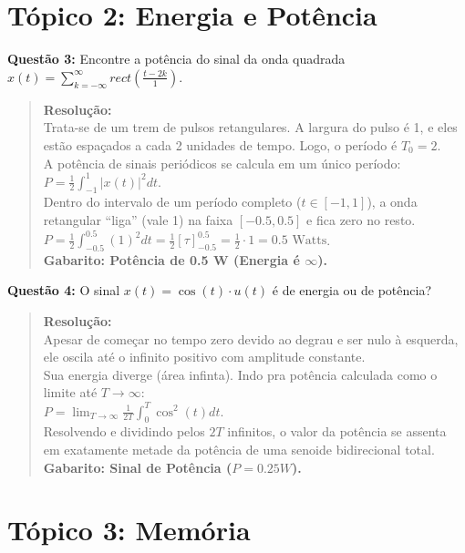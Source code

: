 \section{Tópico 2: Energia e Potência}\label{tuxf3pico-2-energia-e-potuxeancia}

\textbf{Questão 3:} Encontre a potência do sinal da onda quadrada \(x(t) = \sum_{k=-\infty}^{\infty} rect\left(\frac{t - 2k}{1}\right)\).

\begin{quote}
\textbf{Resolução:}\\
Trata-se de um trem de pulsos retangulares. A largura do pulso é 1, e eles estão espaçados a cada 2 unidades de tempo. Logo, o período é \(T_0 = 2\).\\
A potência de sinais periódicos se calcula em um único período:\\
\(P = \frac{1}{2} \int_{-1}^{1} |x(t)|^2 dt\).\\
Dentro do intervalo de um período completo (\(t \in [-1, 1]\)), a onda retangular ``liga'' (vale 1) na faixa \([-0.5, 0.5]\) e fica zero no resto.\\
\(P = \frac{1}{2} \int_{-0.5}^{0.5} (1)^2 dt = \frac{1}{2} \left[ \tau \right]_{-0.5}^{0.5} = \frac{1}{2} \cdot 1 = 0.5 \text{ Watts}\).\\
\textbf{Gabarito: Potência de 0.5 W (Energia é \(\infty\)).}
\end{quote}

\textbf{Questão 4:} O sinal \(x(t) = \cos(t) \cdot u(t)\) é de energia ou de potência?

\begin{quote}
\textbf{Resolução:}\\
Apesar de começar no tempo zero devido ao degrau e ser nulo à esquerda, ele oscila até o infinito positivo com amplitude constante.\\
Sua energia diverge (área infinta). Indo pra potência calculada como o limite até \(T \to \infty\):\\
\(P = \lim_{T \to \infty} \frac{1}{2T} \int_{0}^{T} \cos^2(t) dt\).\\
Resolvendo e dividindo pelos \(2T\) infinitos, o valor da potência se assenta em exatamente metade da potência de uma senoide bidirecional total.\\
\textbf{Gabarito: Sinal de Potência (\(P = 0.25 W\)).}
\end{quote}

\section{Tópico 3: Memória}\label{tuxf3pico-3-memuxf3ria}

